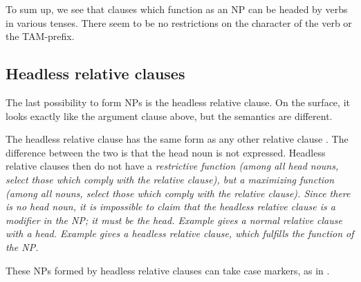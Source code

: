 To sum up, we see that clauses which function as an NP can be headed by verbs in various tenses. There seem to be no restrictions on the character of the verb or the TAM-prefix.

\subsection{Headless relative clauses}\label{sec:nppp:Headlessrelativeclauses}
The last possibility to form NPs is the headless relative clause. On the surface, it looks exactly like the argument clause above, but the semantics are different.


The headless relative clause has the same form as any other relative clause . The difference between the two is that the head noun is not expressed. Headless  relative clauses  then do  not have a \em restrictive \em function (among all head nouns, select those which comply with the relative clause), but a \em maximizing \em function (among \em all \em nouns, select those which comply with the relative clause). Since there is no head noun, it is impossible to claim that the headless relative clause is a modifier in the NP; it must be the head. Example  gives a normal relative clause with a head. Example  gives a headless relative clause, which fulfills the function of the NP.



These NPs formed by headless relative clauses can take case markers, as in .


